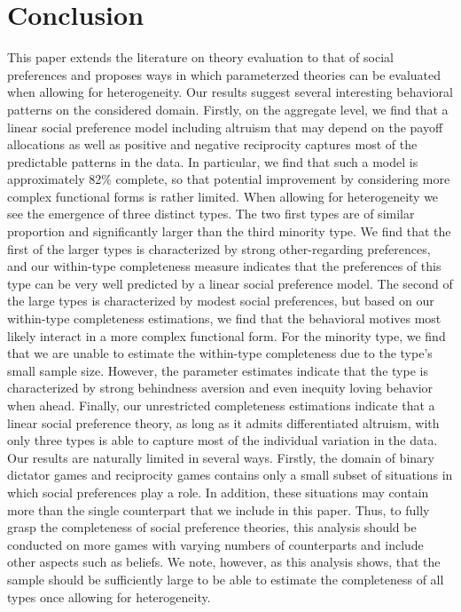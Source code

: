 \documentclass[11pt,a4paper]{article}
\theoremstyle{definition}
\begin{document}
\section{Conclusion}
\label{sec:conclusion}
This paper extends the literature on theory evaluation to that of social preferences and proposes ways in which parameterzed theories can be evaluated when allowing for heterogeneity. Our results suggest several interesting behavioral patterns on the considered domain. Firstly, on the aggregate level, we find that a linear social preference model including altruism that may depend on the payoff allocations as well as positive and negative reciprocity captures most of the predictable patterns in the data. In particular, we find that such a model is approximately 82\% complete, so that potential improvement by considering more complex functional forms is rather limited. When allowing for heterogeneity we see the emergence of three distinct types. The two first types are of similar proportion and significantly larger than the third minority type. We find that the first of the larger types is characterized by strong other-regarding preferences, and our within-type completeness measure indicates that the preferences of this type can be very well predicted by a linear social preference model. The second of the large types is characterized by modest social preferences, but based on our within-type completeness estimations, we find that the behavioral motives most likely interact in a more complex functional form. For the minority type, we find that we are unable to estimate the within-type completeness due to the type's small sample size. However, the parameter estimates indicate that the type is characterized by strong behindness aversion and even inequity loving behavior when ahead. Finally, our unrestricted completeness estimations indicate that a linear social preference theory, as long as it admits differentiated altruism, with only three types is able to capture most of the individual variation in the data. Our results are naturally limited in several ways. Firstly, the domain of binary dictator games and reciprocity games contains only a small subset of situations in which social preferences play a role. In addition, these situations may contain more than the single counterpart that we include in this paper. Thus, to fully grasp the completeness of social preference theories, this analysis should be conducted on more games with varying numbers of counterparts and include other aspects such as beliefs. We note, however, as this analysis shows, that the sample should be sufficiently large to be able to estimate the completeness of all types once allowing for heterogeneity.
\clearpage
\end{document}
